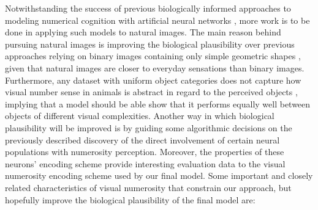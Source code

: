 \documentclass[twocolumn]{article}
\begin{document}
Notwithstanding the success of previous biologically informed approaches
to modeling numerical cognition with artificial neural networks
\citep{stoianov2012}, more work is to be done in applying such models to
natural images. The main reason behind pursuing natural images is
improving the biological plausibility over previous approaches relying
on binary images containing only simple geometric shapes \citep[for
examples, see][]{stoianov2012, wu2018two}, given that natural images are
closer to everyday sensations than binary images. Furthermore, any
dataset with uniform object categories does not capture how visual
number sense in animals is abstract in regard to the perceived objects
\citep{nieder2016neuronal}, implying that a model should be able show
that it performs equally well between objects of different visual
complexities. Another way in which biological plausibility will be
improved is by guiding some algorithmic decisions on the previously
described discovery of the direct involvement of certain neural
populations with numerosity perception. Moreover, the properties of
these neurons' encoding scheme provide interesting evaluation data to
the visual numerosity encoding scheme used by our final model. Some
important and closely related characteristics of visual numerosity that
constrain our approach, but hopefully improve the biological
plausibility of the final model are:
\end{document}

